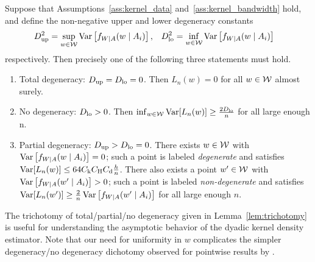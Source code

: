 \begin{lemma}
  \label{lem:trichotomy}

  Suppose that Assumptions~\ref{ass:kernel_data}
  and~\ref{ass:kernel_bandwidth} hold,
  and define the non-negative
  upper and lower degeneracy constants
  \begin{align*}
    D_{\textup{up}}^2
    &=
    \sup_{w \in \mathcal{W}}
    \operatorname{Var}\left[
      f_{W \mid A}(w \mid A_i)
    \right],
    &D_{\textup{lo}}^2
    &=
    \inf_{w \in \mathcal{W}}
    \operatorname{Var}\left[
      f_{W \mid A}(w \mid A_i)
    \right]
  \end{align*}
  respectively.
  Then precisely one of the following three statements must hold.
  \begin{enumerate}[label=(\roman*)]

    \item Total degeneracy:
      $D_{\textup{up}} = D_{\textup{lo}} = 0$.
      Then
      $L_n(w) = 0$ for all $w \in \mathcal{W}$
      almost surely.

    \item No degeneracy:
      $D_{\textup{lo}} > 0$. Then
      $\inf_{w \in \mathcal{W}} \operatorname{Var}[L_n(w)] \geq \frac{2 D_{\textup{lo}}}{n}$
      for all large enough n.

    \item Partial degeneracy:
      $D_{\textup{up}} > D_{\textup{lo}} = 0$.
      There exists $w \in \mathcal{W}$ with
      $\operatorname{Var}\left[f_{W \mid A}(w \mid A_i)\right] = 0$;
      such a point is labeled \emph{degenerate} and satisfies
      $\operatorname{Var}[L_n(w)] \leq 64 C_\mathrm{k} C_\mathrm{H} C_\mathrm{d} \frac{h}{n}$.
      There also exists a point $w' \in \mathcal{W}$ with
      $\operatorname{Var}\left[f_{W \mid A}(w' \mid A_i)\right] > 0$;
      such a point is labeled \emph{non-degenerate} and satisfies
      $\operatorname{Var}[L_n(w')] \geq
      \frac{2}{n} \operatorname{Var}\left[f_{W \mid A}(w' \mid A_i)\right]$
      for all large enough $n$.

  \end{enumerate}

\end{lemma}

\begin{remark}

  The trichotomy of total/partial/no degeneracy
  given in Lemma~\ref{lem:trichotomy} is useful for understanding
  the asymptotic behavior of the dyadic kernel density estimator.
  Note that our need for uniformity in $w$
  complicates the simpler degeneracy/no degeneracy
  dichotomy observed for pointwise results by
  \citet{graham2022kernel}.

\end{remark}

